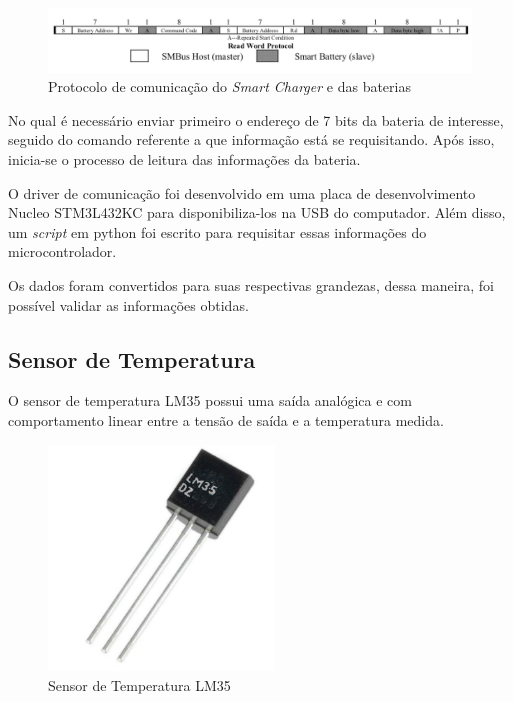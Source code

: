 	    \begin{figure}[!ht]
			   \centering
			   \includegraphics[width=16cm]{Figures/batt_protocol.png}
			   \caption{Protocolo de comunicação do \textit{Smart Charger} e das baterias}
			   \label{fig:batt_protocol}
		\end{figure}   
		
		No qual é necessário enviar primeiro o endereço de 7 bits da bateria de interesse, seguido do comando referente a que informação está se requisitando. Após isso, inicia-se o processo de leitura das informações da bateria.
		
		O driver de comunicação foi desenvolvido em uma placa de desenvolvimento Nucleo STM3L432KC para disponibiliza-los na USB do computador. Além disso, um \textit{script} em python foi escrito para requisitar essas informações do microcontrolador.
	    
	    Os dados foram convertidos para suas respectivas grandezas, dessa maneira, foi possível validar as informações obtidas.
    
    \subsection{Sensor de Temperatura}
    
	    O sensor de temperatura LM35 possui uma saída analógica e com comportamento linear entre a tensão de saída e a temperatura medida.
	    
	    \begin{figure}[!ht]
			   \centering
			   \includegraphics[width=6cm]{Figures/lm35.jpg}
			   \caption{Sensor de Temperatura LM35}
			   \label{fig:LM35}
		\end{figure}
	   
